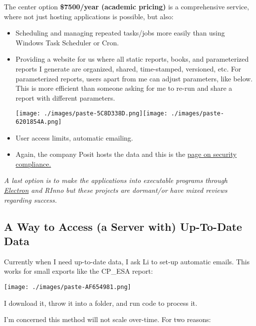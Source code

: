 \documentclass[
  letterpaper,
  DIV=11,
  numbers=noendperiod,
  oneside]{scrreprt}
\begin{document}
The center option \textbf{\$7500/year (academic pricing)} is a
comprehensive service, where not just hosting applications is possible,
but also:

\begin{itemize}
\item
  Scheduling and managing repeated tasks/jobs more easily than using
  Windows Task Scheduler or Cron.
\item
  Providing a website for us where all static reports, books, and
  parameterized reports I generate are organized, shared, time-stamped,
  versioned, etc. For parameterized reports, users apart from me can
  adjust parameters, like below. This is more efficient than someone
  asking for me to re-run and share a report with different parameters.

  \texttt{[image: ./images/paste-5C8D338D.png]}\texttt{[image: ./images/paste-6201854A.png]}
\item
  User access limits, automatic emailing.
\item
  Again, the company Posit hosts the data and this is the
  \href{https:/docs.posit.co/shinyapps.io/security-and-compliance.html}{page
  on security compliance.}
\end{itemize}

\emph{A last option is to make the applications into executable programs
through \href{https://github.com/chasemc/electricShine}{Electron} and
RInno but these projects are dormant/or have mixed reviews regarding
success.}

\hypertarget{a-way-to-access-a-server-with-up-to-date-data}{%
\subsection{A Way to Access (a Server with) Up-To-Date
Data}\label{a-way-to-access-a-server-with-up-to-date-data}}

Currently when I need up-to-date data, I ask Li to set-up automatic
emails. This works for small exports like the CP\_ESA report:

\texttt{[image: ./images/paste-AF654981.png]}

I download it, throw it into a folder, and run code to process it.

I'm concerned this method will not scale over-time. For two reasons:
\end{document}
